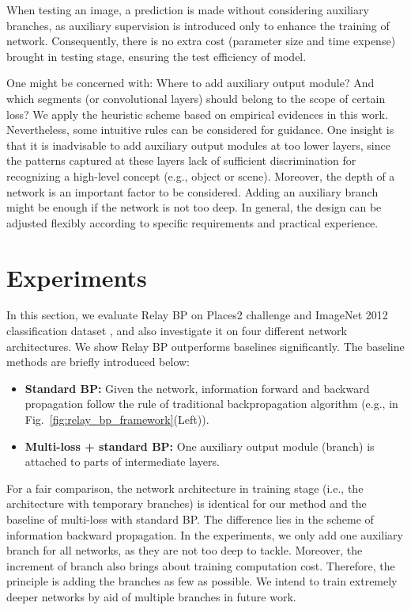 \documentclass[runningheads]{llncs}
\begin{document}
When testing an image, a prediction is made without considering auxiliary branches, as auxiliary supervision is introduced only to enhance the training of network. Consequently, there is no extra cost (parameter size and time expense) brought in testing stage, ensuring the test efficiency of model.

One might be concerned with: Where to add auxiliary output module? And which segments (or convolutional layers) should belong to the scope of certain loss? We apply the heuristic scheme based on empirical evidences in this work. Nevertheless, some intuitive rules can be considered for guidance. One insight is that it is inadvisable to add auxiliary output modules at too lower layers, since the patterns captured at these layers lack of sufficient discrimination for recognizing a high-level concept (e.g., object or scene). Moreover, the depth of a network is an important factor to be considered. Adding an auxiliary branch might be enough if the network is not too deep. In general, the design can be adjusted flexibly according to specific requirements and practical experience.

\section{Experiments}
In this section, we evaluate Relay BP on Places2 challenge \cite{zhou_2015} and ImageNet 2012 classification dataset \cite{russakovsky_ijcv2015}, and also investigate it on four different network architectures. We show Relay BP outperforms baselines significantly. The baseline methods are briefly introduced below:

\begin{itemize}
\item \textbf{Standard BP: } Given the network, information forward and backward propagation follow the rule of traditional backpropagation algorithm (e.g., in Fig.~\ref{fig:relay_bp_framework}(Left)).
\item \textbf{Multi-loss + standard BP: } One auxiliary output module (branch) is attached to parts of intermediate layers.
\end{itemize}

For a fair comparison, the network architecture in training stage (i.e., the architecture with temporary branches) is identical for our method and the baseline of multi-loss with standard BP. The difference lies in the scheme of information backward propagation. In the experiments, we only add one auxiliary branch for all networks, as they are not too deep to tackle. Moreover, the increment of branch also brings about training computation cost. Therefore, the principle is adding the branches as few as possible. We intend to train extremely deeper networks by aid of multiple branches in future work.
\end{document}
